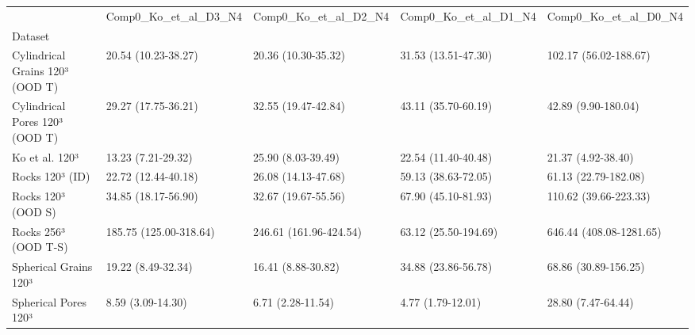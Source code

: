 \begin{tabular}{lllll}
\toprule
 & Comp0_Ko_et_al_D3_N4 & Comp0_Ko_et_al_D2_N4 & Comp0_Ko_et_al_D1_N4 & Comp0_Ko_et_al_D0_N4 \\
Dataset &  &  &  &  \\
\midrule
Cylindrical Grains 120³ (OOD T) & 20.54 (10.23-38.27) & 20.36 (10.30-35.32) & 31.53 (13.51-47.30) & 102.17 (56.02-188.67) \\
Cylindrical Pores 120³ (OOD T) & 29.27 (17.75-36.21) & 32.55 (19.47-42.84) & 43.11 (35.70-60.19) & 42.89 (9.90-180.04) \\
Ko et al. 120³ & 13.23 (7.21-29.32) & 25.90 (8.03-39.49) & 22.54 (11.40-40.48) & 21.37 (4.92-38.40) \\
Rocks 120³ (ID) & 22.72 (12.44-40.18) & 26.08 (14.13-47.68) & 59.13 (38.63-72.05) & 61.13 (22.79-182.08) \\
Rocks 120³ (OOD S) & 34.85 (18.17-56.90) & 32.67 (19.67-55.56) & 67.90 (45.10-81.93) & 110.62 (39.66-223.33) \\
Rocks 256³ (OOD T-S) & 185.75 (125.00-318.64) & 246.61 (161.96-424.54) & 63.12 (25.50-194.69) & 646.44 (408.08-1281.65) \\
Spherical Grains 120³ & 19.22 (8.49-32.34) & 16.41 (8.88-30.82) & 34.88 (23.86-56.78) & 68.86 (30.89-156.25) \\
Spherical Pores 120³ & 8.59 (3.09-14.30) & 6.71 (2.28-11.54) & 4.77 (1.79-12.01) & 28.80 (7.47-64.44) \\
\bottomrule
\end{tabular}
